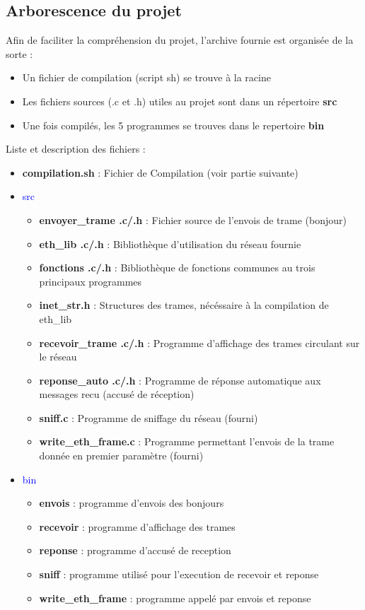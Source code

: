 \documentclass[a4paper,11pt]{article}
\begin{document}
	\subsection{Arborescence du projet}
	Afin de faciliter la compréhension du projet, l'archive fournie est organisée de la sorte :
	\begin{itemize}
	\item Un fichier de compilation (script sh) se trouve à la racine
	\item Les fichiers sources (.c et .h) utiles au projet sont dans un répertoire \textbf{src}
	\item Une fois compilés, les 5 programmes se trouves dans le repertoire \textbf{bin}
	\end{itemize}
		\renewcommand{\labelitemii}{+}
	Liste et description des fichiers :
	\begin{itemize}
	\item \textbf{compilation.sh} : Fichier de Compilation (voir partie suivante)
	\item \textcolor{blue}{src}
		\begin{itemize}
		\item \textbf{envoyer\_trame .c/.h} : Fichier source de l'envois de trame (bonjour)
		\item \textbf{eth\_lib .c/.h} : Bibliothèque d'utilisation du réseau fournie
		\item \textbf{fonctions .c/.h} : Bibliothèque de fonctions communes au trois principaux programmes
		\item \textbf{inet\_str.h} : Structures des trames, nécéssaire à la compilation de eth\_lib
		\item \textbf{recevoir\_trame .c/.h} : Programme d'affichage des trames circulant sur le réseau
		\item \textbf{reponse\_auto .c/.h} : Programme de réponse automatique aux messages recu (accusé de réception)
		\item \textbf{sniff.c} : Programme de sniffage du réseau (fourni)
		\item \textbf{write\_eth\_frame.c} : Programme permettant l'envois de la trame donnée en premier paramètre (fourni)
		\end{itemize}
	\item \textcolor{blue}{bin}
		\begin{itemize}
		\item \textbf{envois} : programme d'envois des bonjours
		\item \textbf{recevoir} : programme d'affichage des trames
		\item \textbf{reponse} : programme d'accusé de reception
		\item \textbf{sniff} : programme utilisé pour l'execution de recevoir et reponse
		\item \textbf{write\_eth\_frame} : programme appelé par envois et reponse
		\end{itemize}
	\end{itemize}
\end{document}
